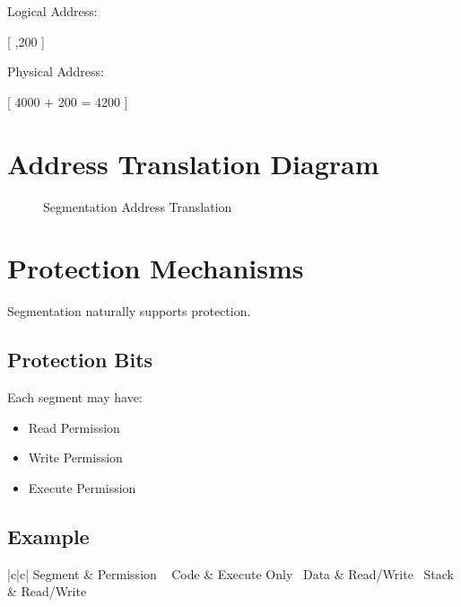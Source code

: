 Logical Address:

[
,200 \rangle
]

Physical Address:

[
4000 + 200 = 4200
]

\section{Address Translation Diagram}

\begin{figure}[h]
\centering
{}
\caption{Segmentation Address Translation}
\end{figure}

\section{Protection Mechanisms}

Segmentation naturally supports protection.

\subsection{Protection Bits}

Each segment may have:

\begin{itemize}
\item Read Permission
\item Write Permission
\item Execute Permission
\end{itemize}

\subsection{Example}

\begin{table}[h]
\centering
\begin{tabular}{|c|c|}
\hline
Segment & Permission \
\hline
Code & Execute Only \
Data & Read/Write \
Stack & Read/Write \
\hline
\end{tabular}
\caption{Segment Protection}
\end{table}

